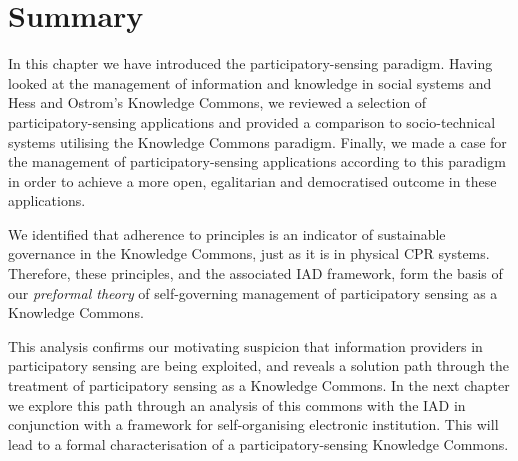 
\section{Summary}

In this chapter we have introduced the participatory-sensing paradigm. Having
looked at the management of information and knowledge in social systems and
Hess and Ostrom's Knowledge Commons, we reviewed a selection of 
participatory-sensing applications and provided a comparison to socio-technical systems
utilising the Knowledge Commons paradigm. Finally, we made a case for the
management of participatory-sensing applications according to this paradigm in
order to achieve a more open, egalitarian and democratised outcome in these
applications.

We identified that adherence to  principles is an
indicator of sustainable governance in the Knowledge Commons, just as it is in
physical \ac{CPR} systems. Therefore, these principles, and the associated
\ac{IAD} framework, form the basis of our \emph{preformal theory} of self-governing
management of participatory sensing as a Knowledge Commons.

This analysis confirms our motivating suspicion that information providers in
participatory sensing are being exploited, and reveals a solution path through
the treatment of participatory sensing as a Knowledge Commons. In the next
chapter we explore this path through an analysis of this commons with the
\ac{IAD} in conjunction with a framework for self-organising electronic
institution. This will lead to a formal characterisation of a 
participatory-sensing Knowledge Commons.


